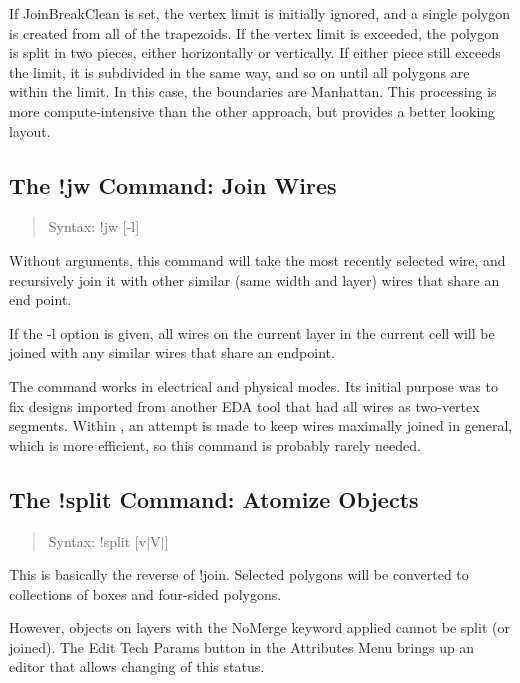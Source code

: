 If {\et JoinBreakClean} is set, the vertex limit is initially ignored,
and a single polygon is created from all of the trapezoids.  If the
vertex limit is exceeded, the polygon is split in two pieces, either
horizontally or vertically.  If either piece still exceeds the limit,
it is subdivided in the same way, and so on until all polygons are
within the limit.  In this case, the boundaries are Manhattan.  This
processing is more compute-intensive than the other approach, but
provides a better looking layout.

\subsection{The {\cb !jw} Command: Join Wires}
\begin{quote}
Syntax: {\vt !jw} [{\vt -l}]
\end{quote}

Without arguments, this command will take the most recently selected
wire, and recursively join it with other similar (same width and
layer) wires that share an end point.
 
If the {\vt -l} option is given, all wires on the current layer in the
current cell will be joined with any similar wires that share an
endpoint.

The command works in electrical and physical modes.  Its initial
purpose was to fix designs imported from another EDA tool that had all
wires as two-vertex segments.  Within {\Xic}, an attempt is made to
keep wires maximally joined in general, which is more efficient, so
this command is probably rarely needed.

\subsection{The {\cb !split} Command: Atomize Objects}
\begin{quote}
Syntax: {\vt !split} [{\vt v}$|${\vt V}$|${}]
\end{quote}
This is basically the reverse of {\cb !join}.  Selected polygons will
be converted to collections of boxes and four-sided polygons.

However, objects on layers with the {\vt NoMerge} keyword applied
cannot be split (or joined).  The {\cb Edit Tech Params} button in the
{\cb Attributes Menu} brings up an editor that allows changing of this
status.

